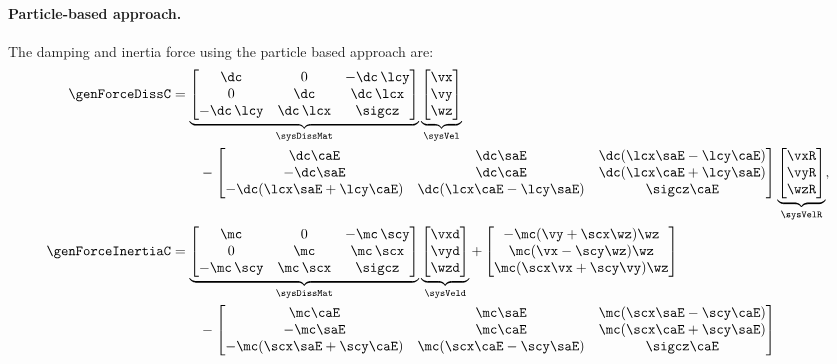 \paragraph{Particle-based approach.}
The damping and inertia force using the particle based approach are:
\begin{subequations}
\begin{align}
 \genForceDissC &=
 \underbrace{\begin{bmatrix} \dc & 0 &-\dc\,\lcy \\ 0 & \dc & \dc\,\lcx \\ -\dc\,\lcy & \dc\,\lcx & \sigcz \end{bmatrix}}_{\sysDissMat}
 \underbrace{\begin{bmatrix} \vx \\ \vy \\ \wz \end{bmatrix}}_{\sysVel}
\nonumber\\
 &\qquad-
 \begin{bmatrix} \dc\caE & \dc\saE & \dc(\lcx\saE-\lcy\caE) \\ -\dc\saE & \dc\caE & \dc(\lcx\caE+\lcy\saE) \\ -\dc(\lcx\saE+\lcy\caE) & \dc(\lcx\caE-\lcy\saE) & \sigcz\caE \end{bmatrix}
 \underbrace{\begin{bmatrix} \vxR \\ \vyR \\ \wzR \end{bmatrix}}_{\sysVelR},
\\
 \genForceInertiaC &=
 \underbrace{\begin{bmatrix} \mc & 0 &-\mc\,\scy \\ 0 & \mc & \mc\,\scx \\ -\mc\,\scy & \mc\,\scx & \sigcz \end{bmatrix}}_{\sysDissMat}
 \underbrace{\begin{bmatrix} \vxd \\ \vyd \\ \wzd \end{bmatrix}}_{\sysVeld}
 +
 \begin{bmatrix} -\mc(\vy + \scx\wz) \wz \\ \mc(\vx-\scy\wz)\wz \\ \mc(\scx\vx+\scy\vy)\wz \end{bmatrix}
\nonumber\\
 &\qquad-
 \begin{bmatrix} \mc\caE & \mc\saE & \mc(\scx\saE-\scy\caE) \\ -\mc\saE & \mc\caE & \mc(\scx\caE+\scy\saE) \\ -\mc(\scx\saE+\scy\caE) & \mc(\scx\caE-\scy\saE) & \sigcz\caE \end{bmatrix}

\end{align}
\end{subequations}
